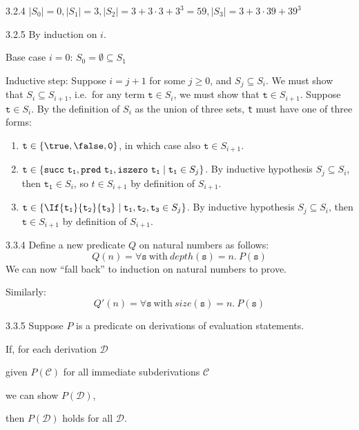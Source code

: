 3.2.4 \(|S_0| = 0, |S_1| = 3, |S_2| = 3 + 3\cdot 3 + 3^3 = 59, |S_3| = 3 + 3 \cdot 39 + 39^3\)

3.2.5 By induction on \(i\).

Base case \(i = 0\): \(S_0 = \emptyset \subseteq S_1\)

{%
\renewcommand{\t}{\mathtt{t}}
Inductive step: Suppose \(i = j+1\) for some \(j \geq 0\), and \(S_j
\subseteq S_i\). We must show that \(S_i \subseteq S_{i+1}\), i.e.\ for any
term \(\t \in S_i\), we must show that \(\t \in S_{i+1}\).
Suppose \(\t \in S_i\). By the definition of \(S_i\) as the union of three
sets, \texttt{t} must have one of three forms:
\begin{enumerate}
  \item \(\t \in \{\true, \false, \mathtt{0}\}\), in which case also \(\t \in S_{i+1}\).
  \item \(\t \in \{{\tt succ~t_1, pred~t_1, iszero~t_1 } \mid \mathtt{t_1} \in S_j\}\).
  By inductive hypothesis \(S_j \subseteq S_i\), then \(\mathtt{t_1} \in
  S_i\), so \(t \in S_{i+1}\) by definition of \(S_{i+1}\).
  \item \(\t \in \{\If{\tt t_1}{\tt t_2}{\tt t_3} \mid \mathtt{t_1},
  \mathtt{t_2}, \mathtt{t_3} \in S_j\}\). By inductive hypothesis \(S_j
  \subseteq S_i\), then \(\t \in S_{i+1}\) by definition of \(S_{i+1}\).
\end{enumerate}
}

3.3.4 Define a new predicate \(Q\) on natural numbers as follows:
\[
  Q(n) = \forall \mathtt{s}~\text{with}~depth(\mathtt{s}) = n.~P(\mathtt{s})
\]
We can now ``fall back'' to induction on natural numbers to prove.

Similarly:
\[
  Q'(n) = \forall \mathtt{s}~\text{with}~size(\mathtt{s}) = n.~P(\mathtt{s})
\]

3.3.5 Suppose \(P\) is a predicate on derivations of evaluation statements.

\begin{addmargin}[12pt]{0pt}
If, for each derivation \(\mathcal{D}\)

\-\hspace{6mm}given \(P(\mathcal{C})\) for all immediate subderivations \(\mathcal{C}\)

\-\hspace{6mm}we can show \(P(\mathcal{D})\),

then \(P(\mathcal{D})\) holds for all \(\mathcal{D}\).
\end{addmargin}

